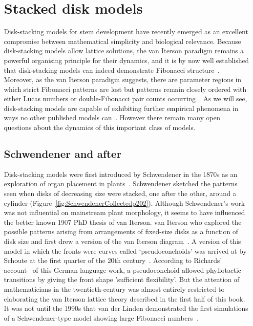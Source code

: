 
\chapter{Stacked disk models}
\label{ch:stackeddisk}

Disk-stacking models for stem development have recently emerged as an excellent compromise between mathematical simplicity and biological relevance. 
Because disk-stacking models allow lattice solutions,  the van Iterson paradigm remains a powerful organising principle for their dynamics, and it is by now well established that disk-stacking models can indeed demonstrate Fibonacci structure~\cite{goleFibonacciQuasisymmetricPhyllotaxis2016}. Moreover, as the van Iterson paradigm suggests, there are parameter regions in which strict Fibonacci patterns are lost but patterns remain closely ordered with either Lucas numbers or double-Fibonacci pair counts occurring~\cite{goleFibonacciQuasisymmetricPhyllotaxis2016,yonekuraMathematicalModelStudies2019}.
As we will see, disk-stacking models are capable of exhibiting further empirical phenomena in ways no other published models can~\cite{swintonDiskstackingModelsAre2024}. However there remain many open questions about the dynamics of this important class of models.
\clearpage
\section{Schwendener and after}
Disk-stacking models were first introduced by Schwendener in the 1870s as an exploration of organ placement in plants~\cite{schwendenerMechanischeTheorieBlattstellungen1878}.  Schwendener sketched the patterns seen when disks of decreasing size were stacked, one after the other, around a cylinder (Figure~\ref{fig:SchwendenerCollectedp202}).
Although Schwendener's work was not influential on mainstream plant morphology, it seems to have influenced the better known 1907 PhD thesis of van Iterson. van Iterson  who explored the possible patterns arising from arrangements of fixed-size disks as a function of disk size and first drew a version of the van Iterson diagram~\cite{vanitersonjrMathematischeUndMikroscopischAnatomische1907}. 
A version of this model in which the fronts were curves called `pseudoconchoids'  was  arrived at by Schoute at the first quarter of the 20th century~\cite{schouteUberPseudokonchoiden1913}. According to  Richards' account~\cite{richardsGeometryPhyllotaxisIts1948}  of this German-language work, a pseudoconchoid allowed phyllotactic transitions by giving the front shape 'sufficient flexibility'. But 
the attention of mathematicians in the twentieth-century was almost entirely restricted to elaborating the van Iterson lattice theory described in the first half of this book.  It was not until the  1990s that van der Linden demonstrated the first simulations of a Schwendener-type model showing large Fibonacci numbers~\cite{vanderlindenCreatingPhyllotaxisDislodgement1990}.

